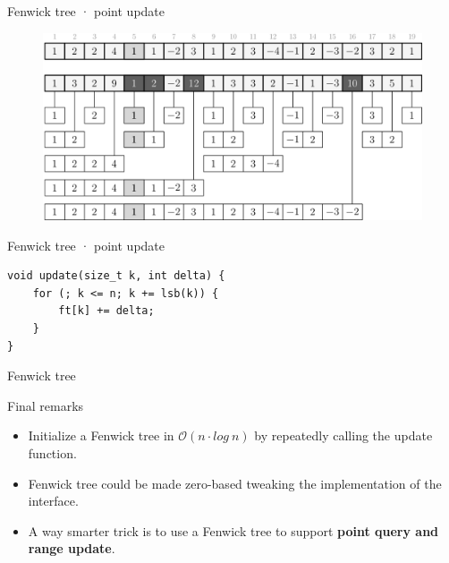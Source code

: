 \documentclass{beamer}
\begin{document}
\begin{frame}{Fenwick tree · point update}
\begin{figure}
\includegraphics[width=\textwidth]{fenwick3.png}
\end{figure}
\end{frame}

\begin{frame}[fragile]{Fenwick tree · point update}
\begin{lstlisting}
void update(size_t k, int delta) {
	for (; k <= n; k += lsb(k)) {
		ft[k] += delta;
	}
}
\end{lstlisting}
\end{frame}

\begin{frame}{Fenwick tree}
\begin{block}{Final remarks}
\begin{itemize}
\item Initialize a Fenwick tree in $\mathcal{O}(n \cdot log ~ n)$  by repeatedly calling the update function.
\item Fenwick tree could be made zero-based tweaking the implementation of the interface.
\item A way smarter trick is to use a Fenwick tree to support \textbf{point query and range update}.
\end{itemize}
\end{block}
\end{frame}
\end{document}
